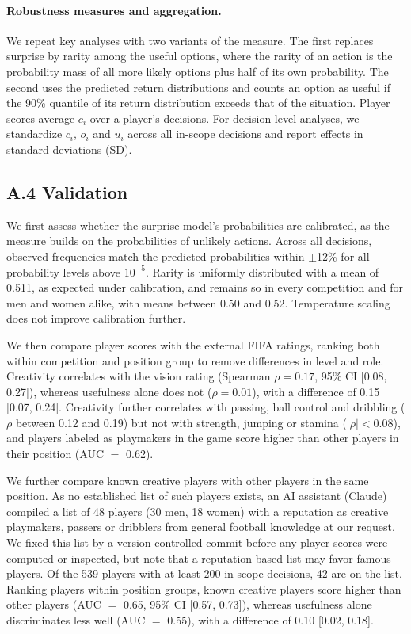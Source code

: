 \paragraph{Robustness measures and aggregation.} We repeat key analyses with two variants of the measure. The first
replaces surprise by rarity among the useful options, where the rarity of an action is the probability mass of all
more likely options plus half of its own probability. The second uses the predicted return distributions and counts
an option as useful if the 90\% quantile of its return distribution exceeds that of the situation. Player scores
average $c_i$ over a player's decisions. For decision-level analyses, we standardize $c_i$, $o_i$ and $u_i$ across all
in-scope decisions and report effects in standard deviations (SD).

\subsection*{A.4 Validation}

We first assess whether the surprise model's probabilities are calibrated, as the measure builds on the probabilities
of unlikely actions. Across all decisions, observed frequencies match the predicted probabilities within $\pm$12\% for
all probability levels above $10^{-5}$. Rarity is uniformly distributed with a mean of 0.511, as expected under
calibration, and remains so in every competition and for men and women alike, with means between 0.50 and 0.52.
Temperature scaling \parencite{guo2017calibration} does not improve calibration further.

We then compare player scores with the external FIFA ratings, ranking both within competition and position group to
remove differences in level and role. Creativity correlates with the vision rating (Spearman $\rho = 0.17$, 95\% CI
[0.08, 0.27]), whereas usefulness alone does not ($\rho = 0.01$), with a difference of 0.15 [0.07, 0.24]. Creativity
further correlates with passing, ball control and dribbling ($\rho$ between 0.12 and 0.19) but not with strength,
jumping or stamina ($|\rho| < 0.08$), and players labeled as playmakers in the game score higher than other players in
their position (AUC $=$ 0.62).

We further compare known creative players with other players in the same position. As no established list of such
players exists, an AI assistant (Claude) compiled a list of 48 players (30 men, 18 women) with a reputation as
creative playmakers, passers or dribblers from general football knowledge at our request. We fixed this list by a
version-controlled commit before any player scores were computed or inspected, but note that a reputation-based list
may favor famous players. Of the 539 players with at least 200 in-scope decisions, 42 are on the list. Ranking players
within position groups, known creative players score higher than other players (AUC $=$ 0.65, 95\% CI [0.57, 0.73]),
whereas usefulness alone discriminates less well (AUC $=$ 0.55), with a difference of 0.10 [0.02, 0.18].

